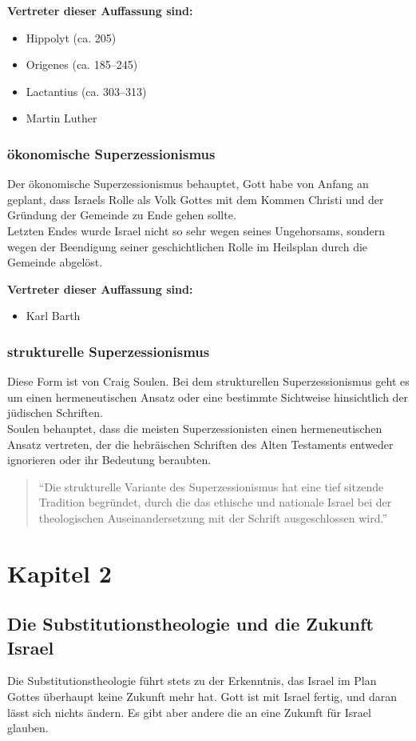 \documentclass{../../inc/mybib}
\newcommand{\st}{Substitutionstheolog}
\newcommand{\sz}{Superzessionismus}
\begin{document}
    \textbf{Vertreter dieser Auffassung sind:}
    \begin{itemize}
        \item Hippolyt (ca. 205)
        \item Origenes (ca. 185--245)
        \item Lactantius (ca. 303--313)
        \item Martin Luther
    \end{itemize}
    \subsubsection{ökonomische \sz}
    Der ökonomische \sz{} behauptet, Gott habe von Anfang an geplant, dass Israels Rolle als Volk Gottes mit dem Kommen Christi und der Gründung der Gemeinde zu Ende gehen sollte.\\
    Letzten Endes wurde Israel nicht so sehr wegen seines Ungehorsams, sondern wegen der Beendigung seiner geschichtlichen Rolle im Heilsplan durch die Gemeinde abgelöst.

    \textbf{Vertreter dieser Auffassung sind:}
    \begin{itemize}        
        \item Karl Barth
    \end{itemize}
    \subsubsection{strukturelle \sz}
    Diese Form ist von Craig Soulen. Bei dem strukturellen \sz{} geht es um einen hermeneutischen Ansatz oder eine bestimmte Sichtweise hinsichtlich der jüdischen Schriften.\\
    Soulen behauptet, dass die meisten Superzessionisten einen hermeneutischen Ansatz vertreten, der die hebräischen Schriften des Alten Testaments entweder ignorieren oder ihr Bedeutung beraubten.
    \begin{quote}
        \enquote{Die strukturelle Variante des \sz{} hat eine tief sitzende Tradition begründet, durch die das ethische und nationale Israel bei der theologischen Auseinandersetzung mit der Schrift ausgeschlossen wird.}
    \end{quote}
    \section{Kapitel 2}
    \subsection{Die \st ie und die Zukunft Israel}
    Die \st ie führt stets zu der Erkenntnis, das Israel im Plan Gottes überhaupt keine Zukunft mehr hat. Gott ist mit Israel fertig, und daran lässt sich nichts ändern.
    Es gibt aber andere die an eine Zukunft für Israel glauben.
\end{document}
